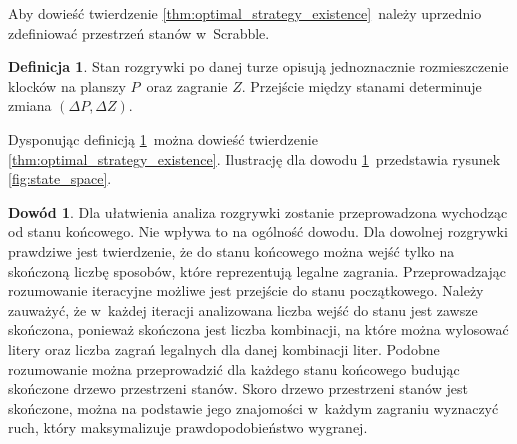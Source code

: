 \documentclass[a4paper,twocolumn,11pt]{article}
\theoremstyle{definition}
\newtheorem{definition}{Definicja}
\newtheorem{pro}{Dowód}
\begin{document}
Aby dowieść twierdzenie \ref{thm:optimal_strategy_existence}~należy uprzednio zdefiniować przestrzeń stanów w~Scrabble.

\begin{definition}
	Stan rozgrywki po danej turze opisują jednoznacznie rozmieszczenie klocków na planszy $P$~oraz zagranie $Z$. Przejście między stanami determinuje zmiana $(\Delta P, \Delta Z)$.
	\label{def:scrabble_state_space}
\end{definition}

Dysponując definicją \ref{def:scrabble_state_space}~można dowieść twierdzenie \ref{thm:optimal_strategy_existence}. Ilustrację dla dowodu \ref{pro:optimal_strategy_existence}~przedstawia rysunek \ref{fig:state_space}.

\begin{pro}
	Dla ułatwienia analiza rozgrywki zostanie przeprowadzona wychodząc od stanu końcowego. Nie wpływa to na ogólność dowodu. Dla dowolnej rozgrywki prawdziwe jest twierdzenie, że do stanu końcowego można wejść tylko na skończoną liczbę sposobów, które reprezentują legalne zagrania. Przeprowadzając rozumowanie iteracyjne możliwe jest przejście do stanu początkowego. Należy zauważyć, że w~każdej iteracji analizowana liczba wejść do stanu jest zawsze skończona, ponieważ skończona jest liczba kombinacji, na które można wylosować litery oraz liczba zagrań legalnych dla danej kombinacji liter. Podobne rozumowanie można przeprowadzić dla każdego stanu końcowego budując skończone drzewo przestrzeni stanów. Skoro drzewo przestrzeni stanów jest skończone, można na podstawie jego znajomości w~każdym zagraniu wyznaczyć ruch, który maksymalizuje prawdopodobieństwo wygranej.
	\label{pro:optimal_strategy_existence}
\end{pro}
\end{document}
